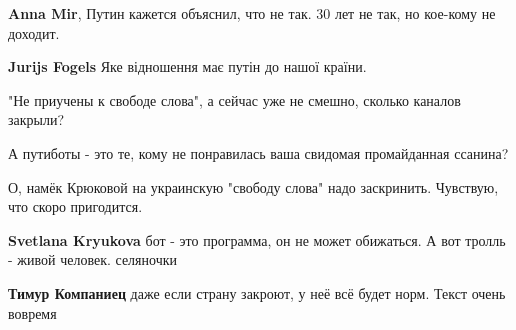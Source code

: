 \begin{itemize}
\begin{itemize}
\textbf{Anna Mir}, Путин кажется объяснил, что не так. 30 лет не так, но кое-кому не доходит.

 
\textbf{Jurijs Fogels} Яке відношення має путін до нашої країни.

 
"Не приучены к свободе слова", а сейчас уже не смешно, сколько каналов закрыли?

 
А путиботы - это те, кому не понравилась ваша свидомая промайданная ссанина?

 
О, намёк Крюковой на украинскую "свободу слова" надо заскринить. Чувствую, что скоро пригодится. \Smiley[1.0][yellow]

 
\textbf{Svetlana Kryukova} бот - это программа, он не может обижаться. А вот тролль - живой человек.
селяночки

 
\textbf{Тимур Компаниец} даже если страну закроют, у неё всё будет норм. Текст очень вовремя

 

\end{itemize}
\end{itemize}
